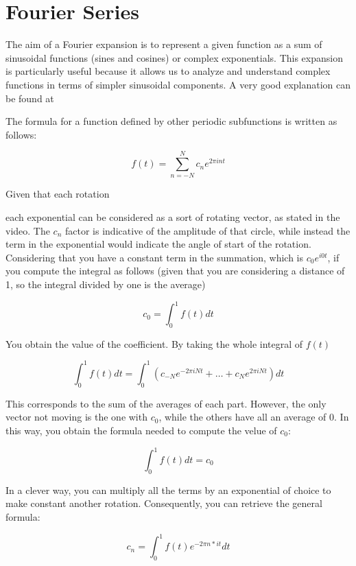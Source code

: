 \section{Fourier Series} \label{chap: fourier}

The aim of a Fourier expansion is to represent a given function as a sum of sinusoidal functions (sines and cosines) or complex exponentials. This expansion is particularly useful because it allows us to analyze and understand complex functions in terms of simpler sinusoidal components. A very good explanation can be found at

The formula for a function defined by other periodic subfunctions is written as follows:

\begin{equation}
    f(t) = \sum_{n = -N}^{N}{c_n e^{2 \pi int}}
\end{equation}

Given that each rotation

each exponential can be considered as a sort of rotating vector, as stated in the video. The $c_n$ factor is indicative of the amplitude of that circle, while instead the term in the exponential would indicate the angle of start of the rotation.
Considering that you have a constant term in the summation, which is $c_0 e^{i0t}$, if you compute the integral as follows (given that you are considering a distance of 1, so the integral divided by one is the average)

$$
c_0 = \int_0^1{f(t)dt}
$$

You obtain the value of the coefficient. By taking the whole integral of $f(t)$

$$
\int_0^1{f(t)dt} = \int_0^1{(c_{-N} e^{-2 \pi iNt} + \dots + c_{N} e^{2 \pi iNt})dt}
$$

This corresponds to the sum of the averages of each part. However, the only vector not moving is the one with $c_0$, while the others have all an average of 0. In this way, you obtain the formula needed to compute the velue of $c_0$:

\begin{equation}
    \int_0^1{f(t)dt} = c_0
\end{equation}

In a clever way, you can multiply all the terms by an exponential of choice to make constant another rotation. Consequently, you can retrieve the general formula:

\begin{equation}
    c_n = \int_0^1{f(t) e^{-2 \pi n * it} dt}
\end{equation}